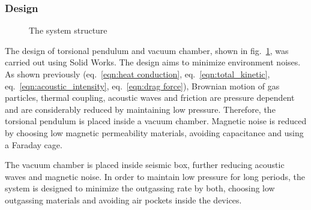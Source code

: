 \documentclass[\main/master.tex]{subfiles}
\begin{document}
\subsubsection{Design}
\begin{figure}[htbp]
	\centering
	\caption[Total chamber]{The system structure}
	\label{fig:Total chamber}
\end{figure}
\FloatBarrier
\par\noindent
The design of torsional pendulum and vacuum chamber, shown in fig.~\ref{fig:Total chamber}, was carried out using Solid Works. The design aims to minimize environment noises. As shown previously (eq.~\ref{eqn:heat conduction}, eq.~\ref{eqn:total_kinetic}, eq.~\ref{eqn:acoustic_intensity}, eq.~\ref{eqn:drag force}), Brownian motion of gas particles, thermal coupling, acoustic waves and friction are pressure dependent and are considerably reduced by maintaining low pressure. Therefore, the torsional pendulum is placed inside a vacuum chamber. Magnetic noise is reduced by choosing low magnetic permeability materials, avoiding capacitance and using a Faraday cage. 
\par\noindent
The vacuum chamber is placed inside seismic box, further reducing acoustic waves and magnetic noise. In order to maintain low pressure for long periods, the system is designed to minimize the outgassing rate by both, choosing low outgassing materials and avoiding air pockets inside the devices. 
\end{document}
